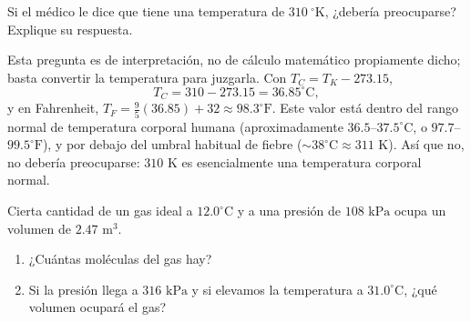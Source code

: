 \documentclass[12pt,a4paper]{article}
\begin{document}
    \begin{problema}
        Si el médico le dice que tiene una temperatura de $310\ ^{\circ}\text{K}$,
        ¿debería preocuparse? Explique su respuesta.
    \end{problema}

    \begin{solucion}
        Esta pregunta es de interpretación, no de cálculo matemático propiamente dicho; basta
        convertir la temperatura para juzgarla. Con $T_{C}=T_{K}-273.15$,
        \begin{equation*}
            T_{C}=310-273.15=36.85^{\circ}\text{C},
        \end{equation*}
        y en Fahrenheit, $T_{F}=\frac{9}{5}(36.85)+32\approx98.3^{\circ}\text{F}$. Este valor está
        dentro del rango normal de temperatura corporal humana (aproximadamente
        $36.5$–$37.5^{\circ}\text{C}$, o $97.7$–$99.5^{\circ}\text{F}$), y por debajo del umbral
        habitual de fiebre ($\sim38^{\circ}\text{C}\approx311\text{ K}$). Así que no, no debería
        preocuparse: $310\text{ K}$ es esencialmente una temperatura corporal normal.
    \end{solucion}

    \begin{problema}
        Cierta cantidad de un gas ideal a $12.0^{\circ}\text{C}$ y a una presión de
        $108\text{ kPa}$ ocupa un volumen de $2.47\text{ m}^{3}$.
        \begin{enumerate}
            \item[(a)] ¿Cuántas moléculas del gas hay?
            \item[(b)] Si la presión llega a $316\text{ kPa}$ y si elevamos la temperatura a
            $31.0^{\circ}\text{C}$, ¿qué volumen ocupará el gas?
        \end{enumerate}
    \end{problema}
\end{document}
